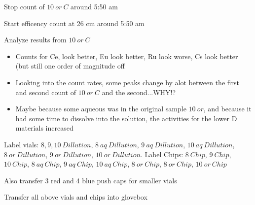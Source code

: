\documentclass[idxtotoc,hyperref,openany,oneside]{labbook} %
\newcommand{\cmark}{\ding{51}}%
\newcommand{\done}{\rlap{$\square$}{\raisebox{2pt}{\large\hspace{1pt}\cmark}}%
  \hspace{-2.5pt}}
\begin{document}



\begin{todolist}
\item[\done]{Stop count of $\boxed{10\ or\ C}$ around 5:50 am}
\item[\done]{Start efficency count at 26 cm around 5:50 am}
\item[\done]{Analyze results from $\boxed{10\ or\ C}$}
  \begin{itemize}
  \item{Counts for Ce, look better, Eu look better,
    Ru look worse, Cs look better (but still one order of magnitude
    off}
  \item{Looking into the count rates, some peaks change by
    alot between the first and second count of $\boxed{10\ or\ C}$
    and the second...WHY!?}
  \item{Maybe because some aqueous was in the original sample
    $\boxed{10\ or}$, and because it had some time to dissolve into
    the solution, the activities for the lower D materials increased}
  \end{itemize}
\end{todolist}

\begin{todolist}
\item[\done]{Label vials: $\boxed{8,9,10\ Dillution}$,
  $\boxed{8\ aq\ Dillution}$,
  $\boxed{9\ aq\ Dillution}$,
  $\boxed{10\ aq\ Dillution}$,
  $\boxed{8\ or\ Dillution}$,
  $\boxed{9\ or\ Dillution}$,
  $\boxed{10\ or\ Dillution}$.
  Label Chips: $\boxed{8\ Chip}$, $\boxed{9\ Chip}$,
  $\boxed{10\ Chip}$,
  $\boxed{8\ aq\ Chip}$, $\boxed{9\ aq\ Chip}$,
  $\boxed{10\ aq\ Chip}$,
  $\boxed{8\ or\ Chip}$, $\boxed{8\ or\ Chip}$,
  $\boxed{10\ or\ Chip}$}
  \begin{todolist}
  \item[\done]{Also transfer 3 red and 4 blue push caps for smaller vials}
  \end{todolist}
\item[\done]{Transfer all above vials and chips into glovebox}
\end{todolist}

\end{document}
